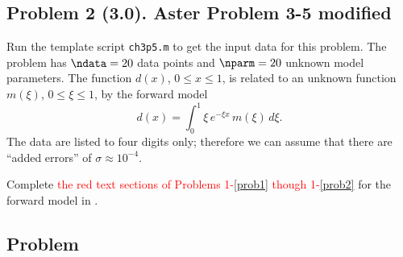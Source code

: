 \documentclass[11pt,titlepage,fleqn]{article}
\newcommand{\numdataA}{20}
\newcommand{\numparmA}{20}
\newcommand{\mv}{\xi}  %
\newcommand{\dv}{x}  %
\begin{document}

\pagebreak
\subsection*{Problem 2 (3.0). Aster Problem 3-5 modified}

Run the template script \verb+ch3p5.m+ to get the input data for this problem.
The problem has $\ndata = \numdataA$ data points and $\nparm = \numparmA$ unknown model parameters.
The function $d(\dv)$, $0 \le \dv \le 1$, is related to an unknown function $m(\mv)$, $0 \le \mv \le 1$, by the forward model
%
\begin{equation}
d(\dv) = \int_0^1 \mv\,e^{-\mv \dv}\,m(\mv)\,d\mv.
\label{dy}
\end{equation}
%
The data are listed to four digits only; therefore we can assume that there are ``added errors'' of $\sigma \approx 10^{-4}$.


\bigskip\noindent
Complete \textcolor{red}{the red text sections of Problems 1-\ref{prob1} though 1-\ref{prob2}} for the forward model in .



\subsection*{Problem} \howmuchtime\






\end{document}
